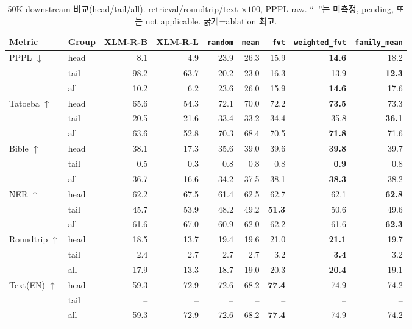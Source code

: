 \documentclass[11pt,a4paper]{article}
\newcommand{\rand}{\texttt{random}}
\newcommand{\meanm}{\texttt{mean}}
\newcommand{\fvt}{\texttt{fvt}}
\newcommand{\wfvt}{\texttt{weighted\_fvt}}
\newcommand{\famm}{\texttt{family\_mean}}
\newcommand{\dn}{$\downarrow$}
\newcommand{\up}{$\uparrow$}
\begin{document}
\begin{table}[H]\centering\small
\caption{50K downstream 비교(head/tail/all). retrieval/roundtrip/text $\times100$, PPPL raw. ``--''는 미측정, pending, 또는 not applicable. 굵게=ablation 최고.}
\label{tab:main}
\begin{tabular}{@{}llrrrrrrr@{}}
\toprule
Metric & Group & XLM-R-B & XLM-R-L & \rand & \meanm & \fvt & \wfvt & \famm \\
\midrule
PPPL \dn & head & 8.1 & 4.9 & 23.9 & 26.3 & 15.9 & \textbf{14.6} & 18.2 \\
         & tail & 98.2 & 63.7 & 20.2 & 23.0 & 16.3 & 13.9 & \textbf{12.3} \\
         & all & 10.2 & 6.2 & 23.6 & 26.0 & 15.9 & \textbf{14.6} & 17.6 \\
\midrule
Tatoeba \up & head & 65.6 & 54.3 & 72.1 & 70.0 & 72.2 & \textbf{73.5} & 73.3 \\
            & tail & 20.5 & 21.6 & 33.4 & 33.2 & 34.4 & 35.8 & \textbf{36.1} \\
            & all & 63.6 & 52.8 & 70.3 & 68.4 & 70.5 & \textbf{71.8} & 71.6 \\
\midrule
Bible \up & head & 38.1 & 17.3 & 35.6 & 39.0 & 39.6 & \textbf{39.8} & 39.7 \\
          & tail & 0.5 & 0.3 & 0.8 & 0.8 & 0.8 & \textbf{0.9} & 0.8 \\
          & all & 36.7 & 16.6 & 34.2 & 37.5 & 38.1 & \textbf{38.3} & 38.2 \\
\midrule
NER \up & head & 62.2 & 67.5 & 61.4 & 62.5 & 62.7 & 62.1 & \textbf{62.8} \\
        & tail & 45.7 & 53.9 & 48.2 & 49.2 & \textbf{51.3} & 50.6 & 49.6 \\
        & all & 61.6 & 67.0 & 60.9 & 62.0 & 62.2 & 61.6 & \textbf{62.3} \\
\midrule
Roundtrip \up & head & 18.5 & 13.7 & 19.4 & 19.6 & 21.0 & \textbf{21.1} & 19.7 \\
              & tail & 2.4 & 2.7 & 2.7 & 2.7 & 3.2 & \textbf{3.4} & 3.2 \\
              & all & 17.9 & 13.3 & 18.7 & 19.0 & 20.3 & \textbf{20.4} & 19.1 \\
\midrule
Text(EN) \up & head & 59.3 & 72.9 & 72.6 & 68.2 & \textbf{77.4} & 74.9 & 74.2 \\
             & tail & -- & -- & -- & -- & -- & -- & -- \\
             & all & 59.3 & 72.9 & 72.6 & 68.2 & \textbf{77.4} & 74.9 & 74.2 \\
\bottomrule
\end{tabular}
\end{table}
\end{document}
